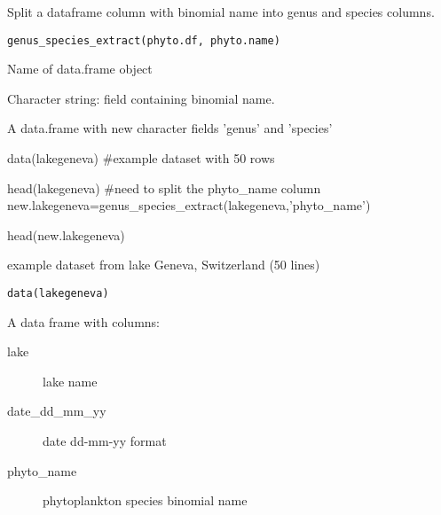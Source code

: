 \documentclass[a4paper]{book}
\begin{document}
%
\begin{Description}\relax
Split a dataframe column with binomial name into genus and species columns.
\end{Description}
%
\begin{Usage}
\begin{verbatim}
genus_species_extract(phyto.df, phyto.name)
\end{verbatim}
\end{Usage}
%
\begin{Arguments}
\begin{ldescription}
\item[\code{phyto.df}] Name of data.frame object

\item[\code{phyto.name}] Character string: field containing binomial name.
\end{ldescription}
\end{Arguments}
%
\begin{Value}
A data.frame with new character fields 'genus' and 'species'
\end{Value}
%
\begin{Examples}
\begin{ExampleCode}
data(lakegeneva)
#example dataset with 50 rows

head(lakegeneva) #need to split the phyto_name column
new.lakegeneva=genus_species_extract(lakegeneva,'phyto_name')

head(new.lakegeneva)
\end{ExampleCode}
\end{Examples}
%
\begin{Description}\relax
example dataset from lake Geneva, Switzerland (50 lines)
\end{Description}
%
\begin{Usage}
\begin{verbatim}
data(lakegeneva)
\end{verbatim}
\end{Usage}
%
\begin{Format}
A data frame with columns:
\begin{description}

\item[lake] lake name
\item[date\_dd\_mm\_yy] date dd-mm-yy format
\item[phyto\_name] phytoplankton species binomial name

\end{description}
\end{Format}
\end{document}
